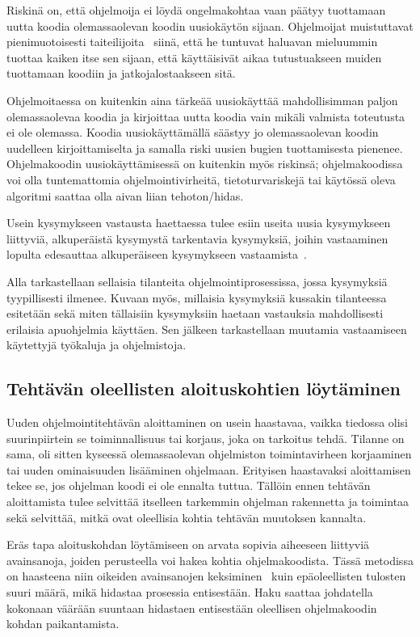 \documentclass[finnish]{tktltiki2}
\theoremstyle{definition}
\theoremstyle{remark}
\begin{document}
Riskinä on, että ohjelmoija ei löydä ongelmakohtaa vaan päätyy tuottamaan uutta koodia olemassaolevan koodin uusiokäytön sijaan. Ohjelmoijat muistuttavat pienimuotoisesti taiteilijoita~\cite{hackers-and-painters} siinä, että he tuntuvat haluavan mieluummin tuottaa kaiken itse sen sijaan, että käyttäisivät aikaa tutustuakseen muiden tuottamaan koodiin ja jatkojalostaakseen sitä.

Ohjelmoitaessa on kuitenkin aina tärkeää uusiokäyttää mahdollisimman paljon olemassaolevaa koodia ja kirjoittaa uutta koodia vain mikäli valmista toteutusta ei ole olemassa. Koodia uusiokäyttämällä säästyy jo olemassaolevan koodin uudelleen kirjoittamiselta ja samalla riski uusien bugien tuottamisesta pienenee. Ohjelmakoodin uusiokäyttämisessä on kuitenkin myös riskinsä; ohjelmakoodissa voi olla tuntemattomia ohjelmointivirheitä, tietoturvariskejä tai käytössä oleva algoritmi saattaa olla aivan liian tehoton/hidas.

Usein kysymykseen vastausta haettaessa tulee esiin useita uusia kysymykseen liittyviä, alkuperäistä kysymystä tarkentavia kysymyksiä, joihin vastaaminen lopulta edesauttaa alkuperäiseen kysymykseen vastaamista~\cite{questions-during-software-evolution-tasks}.

Alla tarkastellaan sellaisia tilanteita ohjelmointiprosessissa, jossa kysymyksiä tyypillisesti ilmenee. Kuvaan myös, millaisia kysymyksiä kussakin tilanteessa esitetään sekä miten tällaisiin kysymyksiin haetaan vastauksia mahdollisesti erilaisia apuohjelmia käyttäen. Sen jälkeen tarkastellaan muutamia vastaamiseen käytettyjä työkaluja ja ohjelmistoja.

\subsection{Tehtävän oleellisten aloituskohtien löytäminen}

Uuden ohjelmointitehtävän aloittaminen on usein haastavaa, vaikka tiedossa olisi suurinpiirtein se toiminnallisuus tai korjaus, joka on tarkoitus tehdä. Tilanne on sama, oli sitten kyseessä olemassaolevan ohjelmiston toimintavirheen korjaaminen tai uuden ominaisuuden lisääminen ohjelmaan. Erityisen haastavaksi aloittamisen tekee se, jos ohjelman koodi ei ole ennalta tuttua. Tällöin ennen tehtävän aloittamista tulee selvittää itselleen tarkemmin ohjelman rakennetta ja toimintaa sekä selvittää, mitkä ovat oleellisia kohtia tehtävän muutoksen kannalta.

Eräs tapa aloituskohdan löytämiseen on arvata sopivia aiheeseen liittyviä avainsanoja, joiden perusteella voi hakea kohtia ohjelmakoodista. Tässä metodissa on haasteena niin oikeiden avainsanojen keksiminen~\cite{what-to-search-for} kuin epäoleellisten tulosten suuri määrä, mikä hidastaa prosessia entisestään. Haku saattaa johdatella kokonaan väärään suuntaan hidastaen entisestään oleellisen ohjelmakoodin kohdan paikantamista.
\end{document}
